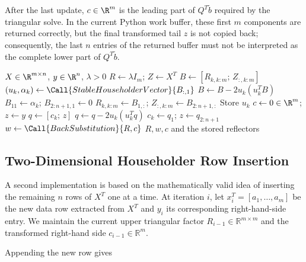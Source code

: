 \noindent After the last update, $c\in\R^m$ is the leading part of
$Q^T\tilde b$ required by the triangular solve. In the current Python work
buffer, these first $m$ components are returned correctly, but the final
transformed tail $z$ is not copied back; consequently, the last $n$ entries
of the returned buffer must not be interpreted as the complete lower part of
$Q^T\tilde b$.

\begin{algorithm}[H]
\caption{Structure-Based Householder QR by Columns}
\label{alg:structure_based_householder}
\begin{algorithmic}[1]
    \Require $X\in\R^{m\times n}$, $y\in\R^n$, $\lambda>0$
    \State $R\gets\lambda I_m$; \quad $Z\gets X^T$
        \State $B\gets[R_{k,k:m};\,Z_{:,k:m}]$
        \State $(u_k,\alpha_k)\gets\Call{StableHouseholderVector}{B_{:,1}}$
            \State $B\gets B-2u_k(u_k^T B)$
        \EndIf
        \State $B_{11}\gets\alpha_k$; \quad $B_{2:n+1,1}\gets0$
        \State $R_{k,k:m}\gets B_{1,:}$; \quad $Z_{:,k:m}\gets B_{2:n+1,:}$
        \State Store $u_k$
    \EndFor
    \State $c\gets0\in\R^m$; \quad $z\gets y$
        \State $q\gets[c_k;\,z]$
            \State $q\gets q-2u_k(u_k^T q)$
        \EndIf
        \State $c_k\gets q_1$; \quad $z\gets q_{2:n+1}$
    \EndFor
    \State $w\gets\Call{BackSubstitution}{R,c}$
    \State \Return $R,w,c$ and the stored reflectors
\end{algorithmic}
\end{algorithm}

\subsection{Two-Dimensional Householder Row Insertion}
\label{sec:row_insertion_householder}

\noindent A second implementation is based on the mathematically valid idea of
inserting the remaining $n$ rows of $X^T$ one at a time.
At iteration $i$, let $x_i^T = [a_1,\ldots,a_m]$ be the new data row extracted from $X^T$ and $y_i$ its corresponding right-hand-side entry. We maintain the current upper triangular factor $R_{i-1} \in \mathbb{R}^{m \times m}$ and the transformed right-hand side $c_{i-1} \in \mathbb{R}^{m}$.

\noindent Appending the new row gives

